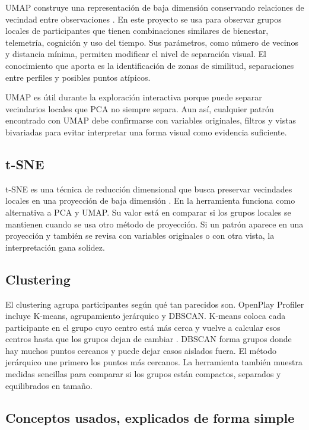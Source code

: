 \documentclass[12pt,a4paper]{article}
\begin{document}
UMAP construye una representaci\'on de baja dimensi\'on conservando relaciones de vecindad entre observaciones \cite{umap}. En este proyecto se usa para observar grupos locales de participantes que tienen combinaciones similares de bienestar, telemetr\'ia, cognici\'on y uso del tiempo. Sus par\'ametros, como n\'umero de vecinos y distancia m\'inima, permiten modificar el nivel de separaci\'on visual. El conocimiento que aporta es la identificaci\'on de zonas de similitud, separaciones entre perfiles y posibles puntos at\'ipicos.

UMAP es \'util durante la exploraci\'on interactiva porque puede separar vecindarios locales que PCA no siempre separa. Aun as\'i, cualquier patr\'on encontrado con UMAP debe confirmarse con variables originales, filtros y vistas bivariadas para evitar interpretar una forma visual como evidencia suficiente.

\subsection{t-SNE}

t-SNE es una t\'ecnica de reducci\'on dimensional que busca preservar vecindades locales en una proyecci\'on de baja dimensi\'on \cite{tsne}. En la herramienta funciona como alternativa a PCA y UMAP. Su valor est\'a en comparar si los grupos locales se mantienen cuando se usa otro m\'etodo de proyecci\'on. Si un patr\'on aparece en una proyecci\'on y tambi\'en se revisa con variables originales o con otra vista, la interpretaci\'on gana solidez.

\subsection{Clustering}

El clustering agrupa participantes seg\'un qu\'e tan parecidos son. OpenPlay Profiler incluye K-means, agrupamiento jer\'arquico y DBSCAN. K-means coloca cada participante en el grupo cuyo centro est\'a m\'as cerca y vuelve a calcular esos centros hasta que los grupos dejan de cambiar \cite{kmeans}. DBSCAN forma grupos donde hay muchos puntos cercanos y puede dejar casos aislados fuera. El m\'etodo jer\'arquico une primero los puntos m\'as cercanos. La herramienta tambi\'en muestra medidas sencillas para comparar si los grupos est\'an compactos, separados y equilibrados en tama\~no.

\subsection{Conceptos usados, explicados de forma simple}
\end{document}
